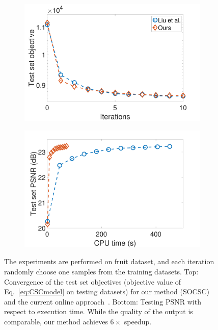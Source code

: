 \begin{figure}[h]
\centering
\begin{subfigure}{0.45\textwidth}
  \includegraphics[width=1\linewidth]{figure/onlineVSliu-ite-fruit.pdf}
\end{subfigure}
\begin{subfigure}{0.45\textwidth}
  \includegraphics[width=1\linewidth]{figure/onlineVSliu-time-fruit.pdf}
\end{subfigure}

\caption{The experiments are performed on fruit dataset, and each iteration randomly choose one samples from the training datasets. Top: Convergence of the test set objectives (objective value of Eq.~\ref{eq:CSCmodel} on testing datasets) for our method (SOCSC) and the current online approach~\cite{liu-2018-first}. Bottom: Testing PSNR with respect to execution time. While the quality of the output is comparable, our method achieves $6 \times$ speedup.}
\label{fig:onlineSmall}
\end{figure}

